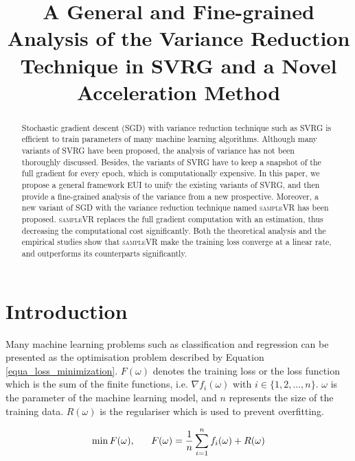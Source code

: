 \documentclass[letterpaper]{article}
\begin{document}
%
\title{A General and Fine-grained Analysis of the Variance Reduction Technique in SVRG and a Novel Acceleration Method}
\maketitle
\begin{abstract}
Stochastic gradient descent (SGD) with variance reduction  technique such as SVRG is efficient to train parameters of many machine learning algorithms. Although many variants of SVRG have been proposed,  the analysis of variance has not been thoroughly discussed. Besides,  the variants of SVRG have to keep a snapshot of the full gradient for every epoch, which is computationally expensive. In this paper, we propose a general framework EUI  to unify the existing variants of SVRG, and then  provide a fine-grained analysis of the variance from a new prospective. Moreover,   a new variant of SGD with the variance reduction technique named \textsc{sampleVR} has been proposed. \textsc{sampleVR} replaces the full gradient computation with an estimation, thus decreasing the computational cost significantly.  Both the theoretical analysis and the empirical studies show that \textsc{sampleVR}  make the training loss converge at a linear rate, and outperforms its counterparts significantly. 
\end{abstract}

\section{Introduction}
\label{sect_introduction}
Many machine learning problems such as classification and regression  can be  presented as the optimisation problem described by Equation \ref{equa_loss_minimization}. $F(\omega)$ denotes the training loss or the loss function which is the sum of the finite functions, i.e. $\nabla f_i(\omega)$ with $i\in\{1,2, ..., n\}$. $\omega$ is the parameter of the machine learning model, and $n$ represents the size of the training data. $R(\omega)$ is the regulariser  which is used to prevent overfitting.    

\begin{equation}
\label{equa_loss_minimization}
\min F(\omega),~~~~~F(\omega)=\frac{1}{n}\sum\limits_{i=1}^n f_i(\omega)+R(\omega)\\
\end{equation}
\end{document}
